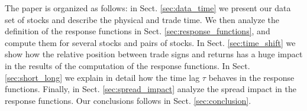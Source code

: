 The paper is organized as follows: in Sect. \ref{sec:data_time} we present our
data set of stocks and describe the physical and trade time. We then
analyze the definition of the response functions in Sect.
\ref{sec:response_functions}, and compute them for several stocks and pairs of
stocks. In Sect. \ref{sec:time_shift} we show how the relative position between
trade signs and returns has a huge impact in the results of the computation of
the response functions. In Sect. \ref{sec:short_long} we explain in detail how
the time lag $\tau$ behaves in the response functions. Finally, in Sect.
\ref{sec:spread_impact} analyze the spread impact in the response functions.
 Our conclusions follows in Sect. \ref{sec:conclusion}.